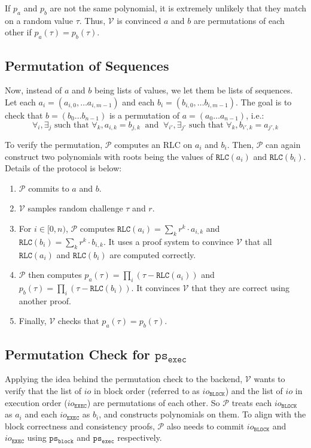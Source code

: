 \documentclass{article}
\renewcommand{\P}{\mathcal{P}}
\newcommand{\V}{\mathcal{V}}
\newcommand{\RLC}{\mathtt{RLC}}
\newcommand{\iob}{io_{\mathtt{BLOCK}}}
\newcommand{\ioe}{io_{\mathtt{EXEC}}}
\newcommand{\psb}{\mathtt{ps_{block}}}
\newcommand{\pse}{\mathtt{ps_{exec}}}
\begin{document}
If $p_a$ and $p_b$ are not the same polynomial, it is extremely unlikely that they match on a random value $\tau$. Thus, $\V$ is convinced $a$ and $b$ are permutations of each other if $p_a(\tau) = p_b(\tau)$.

\subsection{Permutation of Sequences}

Now, instead of $a$ and $b$ being lists of values, we let them be lists of sequences. Let each $a_i = (a_{i, 0}, \dots a_{i, m-1})$ and each $b_i = (b_{i, 0}, \dots b_{i, m-1})$. The goal is to check that $b = (b_0\dots b_{n-1})$ is a permutation of $a = (a_0\dots a_{n-1})$, i.e.:
$$\forall_i, \exists_j \mbox{ such that } \forall_k, a_{i, k} = b_{j, k} \ \mbox{ and }\ \forall_{i'}, \exists_{j'} \mbox{ such that } \forall_k, b_{i', k} = a_{j', k}$$

To verify the permutation, $\P$ computes an RLC on $a_i$ and $b_i$. Then, $\P$ can again construct two polynomials with roots being the values of $\RLC(a_i)$ and $\RLC(b_i)$. Details of the protocol is below:
\begin{enumerate}
    \item $\P$ commits to $a$ and $b$.
    \item $\V$ samples random challenge $\tau$ and $r$.
    \item For $i\in [0, n)$, $\P$ computes $\RLC(a_i) = \sum_k r^k \cdot a_{i, k}$ and $\RLC(b_i) = \sum_k r^k \cdot b_{i, k}$. It uses a proof system to convince $\V$ that all $\RLC(a_i)$ and $\RLC(b_i)$ are computed correctly.
    \item $\P$ then computes $p_a(\tau) = \prod_i (\tau - \RLC(a_i))$ and $p_b(\tau) = \prod_i (\tau - \RLC(b_i))$. It convinces $\V$ that they are correct using another proof.
    \item Finally, $\V$ checks that $p_a(\tau) = p_b(\tau)$.
\end{enumerate}

\subsection{Permutation Check for $\pse$}

Applying the idea behind the permutation check to the backend, $\V$ wants to verify that the list of $io$ in block order (referred to as $\iob$) and the list of $io$ in execution order ($\ioe$) are permutations of each other. So $\P$ treats each $\iob$ as $a_i$ and each $\ioe$ as $b_i$, and constructs polynomials on them. To align with the block correctness and consistency proofs, $\P$ also needs to commit $\iob$ and $\ioe$ using $\psb$ and $\pse$ respectively.
\end{document}
